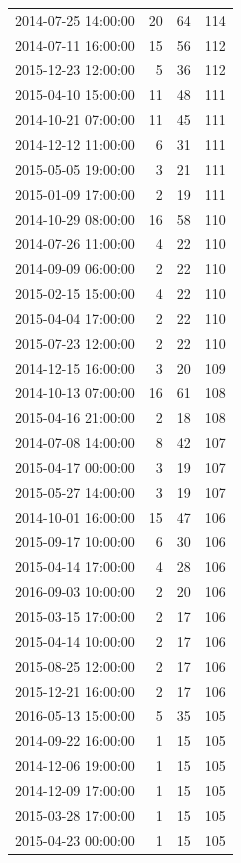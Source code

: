 \begin{tabular}{lrrr}
2014-07-25 14:00:00 & 20 & 64 & 114 \\
2014-07-11 16:00:00 & 15 & 56 & 112 \\
2015-12-23 12:00:00 & 5 & 36 & 112 \\
2015-04-10 15:00:00 & 11 & 48 & 111 \\
2014-10-21 07:00:00 & 11 & 45 & 111 \\
2014-12-12 11:00:00 & 6 & 31 & 111 \\
2015-05-05 19:00:00 & 3 & 21 & 111 \\
2015-01-09 17:00:00 & 2 & 19 & 111 \\
2014-10-29 08:00:00 & 16 & 58 & 110 \\
2014-07-26 11:00:00 & 4 & 22 & 110 \\
2014-09-09 06:00:00 & 2 & 22 & 110 \\
2015-02-15 15:00:00 & 4 & 22 & 110 \\
2015-04-04 17:00:00 & 2 & 22 & 110 \\
2015-07-23 12:00:00 & 2 & 22 & 110 \\
2014-12-15 16:00:00 & 3 & 20 & 109 \\
2014-10-13 07:00:00 & 16 & 61 & 108 \\
2015-04-16 21:00:00 & 2 & 18 & 108 \\
2014-07-08 14:00:00 & 8 & 42 & 107 \\
2015-04-17 00:00:00 & 3 & 19 & 107 \\
2015-05-27 14:00:00 & 3 & 19 & 107 \\
2014-10-01 16:00:00 & 15 & 47 & 106 \\
2015-09-17 10:00:00 & 6 & 30 & 106 \\
2015-04-14 17:00:00 & 4 & 28 & 106 \\
2016-09-03 10:00:00 & 2 & 20 & 106 \\
2015-03-15 17:00:00 & 2 & 17 & 106 \\
2015-04-14 10:00:00 & 2 & 17 & 106 \\
2015-08-25 12:00:00 & 2 & 17 & 106 \\
2015-12-21 16:00:00 & 2 & 17 & 106 \\
2016-05-13 15:00:00 & 5 & 35 & 105 \\
2014-09-22 16:00:00 & 1 & 15 & 105 \\
2014-12-06 19:00:00 & 1 & 15 & 105 \\
2014-12-09 17:00:00 & 1 & 15 & 105 \\
2015-03-28 17:00:00 & 1 & 15 & 105 \\
2015-04-23 00:00:00 & 1 & 15 & 105 \\

\end{tabular}
